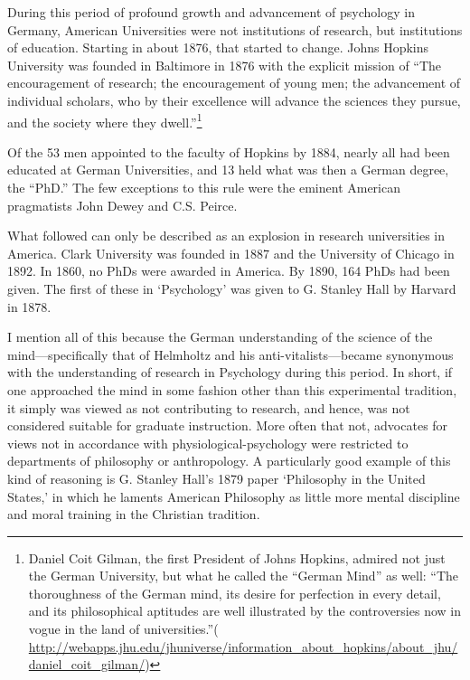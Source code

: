 \begin{refsection}
During this period of profound growth and advancement of psychology in Germany, American Universities were not institutions of research, but institutions of education. Starting in about 1876, that started to change. Johns Hopkins University was founded in Baltimore in 1876 with the explicit mission of ``The encouragement of research; the encouragement of young men; the advancement of individual scholars, who by their excellence will advance the sciences they pursue, and the society where they dwell.''\footnote{Daniel Coit Gilman, the first President of Johns Hopkins, admired not just the German University, but what he called the ``German Mind'' as well: “The thoroughness of the German mind, its desire for perfection in every detail, and its philosophical aptitudes are well illustrated by the controversies now in vogue in the land of universities.”( \url{http://webapps.jhu.edu/jhuniverse/information_about_hopkins/about_jhu/daniel_coit_gilman/})} 

Of the 53 men appointed to the faculty of Hopkins by 1884, nearly all had been educated at German Universities, and 13 held what was then a German degree, the “PhD.” The few exceptions to this rule were the eminent American pragmatists John Dewey and C.S. Peirce. 

What followed can only be described as an explosion in research universities in America. Clark University was founded in 1887 and the University of Chicago in 1892. In 1860, no PhDs were awarded in America. By 1890, 164 PhDs had been given. The first of these in ‘Psychology’ was given to G. Stanley Hall by Harvard in 1878.

I mention all of this because the German understanding of the science of the mind---specifically that of Helmholtz and his anti-vitalists---became synonymous with the understanding of research in Psychology during this period. In short, if one approached the mind in some fashion other than this experimental tradition, it simply was viewed as not contributing to research, and hence, was not considered suitable for graduate instruction. More often that not, advocates for views not in accordance with physiological-psychology were restricted to departments of philosophy or anthropology. A particularly good example of this kind of reasoning is G. Stanley Hall’s 1879 paper ‘Philosophy in the United States,’ in which he laments American Philosophy as little more mental discipline and moral training in the Christian tradition.


\end{refsection}
